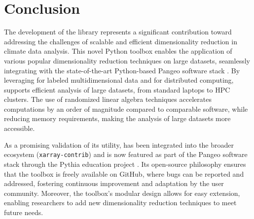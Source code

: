     
    
    

\section{Conclusion}
\label{sec:xeofs:conclusion}

The development of the  library represents a significant contribution toward addressing the challenges of scalable and efficient dimensionality reduction in climate data analysis. This novel Python toolbox enables the application of various popular dimensionality reduction techniques on large datasets, seamlessly integrating with the state-of-the-art Python-based Pangeo software stack \cite{pangeo}. By leveraging  for labeled multidimensional data and  for distributed computing,  supports efficient analysis of large datasets, from standard laptops to HPC clusters. The use of randomized linear algebra techniques accelerates computations by an order of magnitude compared to comparable software, while reducing memory requirements, making the analysis of large datasets more accessible.

As a promising validation of its utility,  has been integrated into the broader  ecosystem (\texttt{xarray-contrib}) and is now featured as part of the Pangeo software stack through the Pythia education project \cite[e.g.][]{ford_eofs_2024}. Its open-source philosophy ensures that the toolbox is freely available on GitHub, where bugs can be reported and addressed, fostering continuous improvement and adaptation by the user community. Moreover, the toolbox's modular design allows for easy extension, enabling researchers to add new dimensionality reduction techniques to meet future needs.

